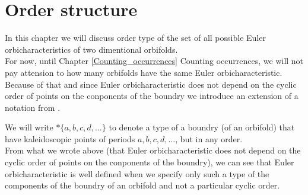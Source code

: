 \chapter{Order structure}

In this chapter we will discuss order type of the set of all possible Euler orbicharacteristics 
of two dimentional orbifolds. \\
For now, until Chapter \ref{Counting_occurrences} Counting occurrences, we will not pay attension 
to how many orbifolds have the same Euler orbicharacteristic. \\ 
Because of that and since Euler orbicharacteristic does not depend on the cyclic order 
of points on the conponents of the boundry we introduce an extension of a notation from 
\cite{Conway2008}. 


We will write $*\{a,b,c,d,\dots\}$ to denote a type of a boundry (of an orbifold) that have 
kaleidoscopic points of periods $a,b,c,d,\dots$, but in any order. \\


From what we wrote above (that Euler orbicharacteristic does not depend on the cyclic order 
of points on the conponents of the boundry), we can see that Euler 
orbicharacteristic is well defined 
when we specify only such a type of the components of the boundry of an orbifold and not 
a particular cyclic order.  \\

\section{}


